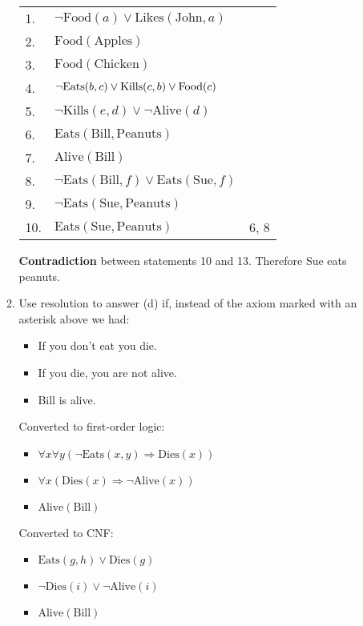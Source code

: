 \documentclass[12pt]{article}
\begin{document}
\begin{enumerate}
\begin{enumerate}
				\begin{tabular}{ l l r }
					1. & $\neg \text{Food}(a) \lor \text{Likes}(\text{John}, a)$ & \\
					2. & $\text{Food}(\text{Apples})$ & \\
					3. & $\text{Food}(\text{Chicken})$ & \\
					4. & $\neg \text{Eats}(b, c) \lor  \text{\text{Kills}}(c, b) \lor \text{Food}(c)$ & \\
					5. & $\neg \text{Kills}(e, d) \lor \neg \text{Alive}(d)$ & \\
					6. & $\text{Eats}(\text{Bill}, \text{Peanuts})$ & \\
					7. & $\text{Alive}(\text{Bill})$ & \\
					8. & $\neg \text{Eats}(\text{Bill}, f) \lor \text{Eats}(\text{Sue}, f)$ & \\
					9. & $\neg \text{Eats}(\text{Sue}, \text{Peanuts})$ & \\
					\toprule
					10. & $\text{Eats}(\text{Sue}, \text{Peanuts})$ & 6, 8 \\
				\end{tabular}

				\textbf{Contradiction} between statements 10 and 13. Therefore Sue eats peanuts.

			\item Use resolution to answer (d) if, instead of the axiom marked with an asterisk above we had:

				\begin{itemize}
					\item If you don't eat you die.
					\item If you die, you are not alive.
					\item Bill is alive.
				\end{itemize}

				Converted to first-order logic:

				\begin{itemize}
					\item $\forall x \forall y (\neg \text{Eats}(x, y) \Rightarrow \text{Dies}(x))$
					\item $\forall x (\text{Dies}(x) \Rightarrow \neg \text{Alive}(x))$
					\item $\text{Alive}(\text{Bill})$
				\end{itemize}

				Converted to CNF:

				\begin{itemize}
					\item $\text{Eats}(g, h) \lor \text{Dies}(g)$
					\item $\neg \text{Dies}(i) \lor \neg \text{Alive}(i)$
					\item $\text{Alive}(\text{Bill})$
				\end{itemize}


\end{enumerate}
\end{enumerate}
\end{document}
